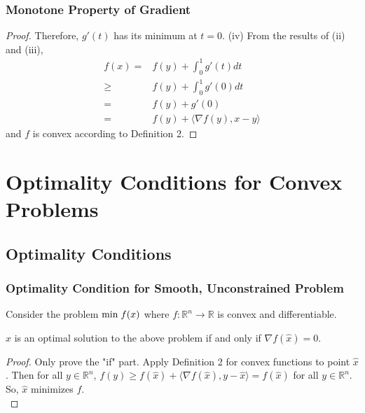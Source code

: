 \begin{frame}\frametitle{Monotone Property of Gradient}
    \begin{proof}
        Therefore, $g'(t)$ has its minimum at $t=0$.
        (iv) From the results of (ii) and (iii),
        \begin{align*}
            f(x) ={ }& f(y)+\int_{0}^{1} g'(t)dt\\
            \geq{ }& f(y) + \int_{0}^{1} g'(0)dt\\
            ={ }& f(y) + g'(0)\\
            ={ }& f(y) + \langle \nabla f(y), x-y \rangle
        \end{align*}
        and $f$ is convex according to Definition 2.
    \end{proof}
\end{frame}


\section{Optimality Conditions for Convex Problems}
\subsection{Optimality Conditions}
\begin{frame}\frametitle{Optimality Condition for Smooth, Unconstrained Problem}
    \hspace{2mm}Consider the problem \textbf{$\text{min} \hspace{1mm} f(x)$} where $f: \mathbb{R}^n \rightarrow \mathbb{R}$ is convex and differentiable.\\
    \vspace*{3mm}
    \begin{theorem}
        $\hat{x}$ is an optimal solution to the above problem if and only if $\nabla f(\hat{x}) = 0$.
    \end{theorem}
    \begin{proof}
        Only prove the "if" part. Apply Definition 2 for convex functions to point $\hat{x}$. Then for all $y \in \mathbb{R}^n$, $f(y) \geq f(\hat{x}) + \langle \nabla f(\hat{x}), y-\hat{x} \rangle = f(\hat{x})$ for all $y \in \mathbb{R}^n$. So, $\hat{x}$ minimizes $f$.\\
    \end{proof}
\end{frame}

